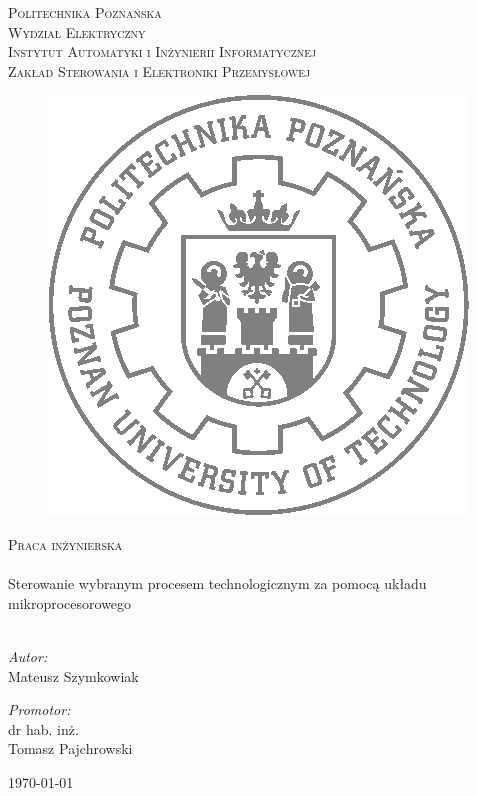 \begin{titlepage}
	\begin{center}
		\textsc{\LARGE Politechnika Poznańska}\\[0.3cm] 
		\textsc{\large Wydział Elektryczny}\\[0.3cm]
		\textsc{\large Instytut Automatyki i Inżynierii Informatycznej}\\[0.3cm]
		\textsc{\large Zakład Sterowania i Elektroniki Przemysłowej}\\[0.3cm]
		\begin{figure}[!ht]
		\centering
		\includegraphics[scale=0.5]{pictures/logoPP.png}
		\end{figure}
		\textsc{\Large Praca inżynierska}\\[0.5cm]
		\HRule \\[0.4cm]
		{ \huge  Sterowanie wybranym procesem technologicznym za pomocą układu mikroprocesorowego\\[0.4cm] }
		\HRule \\[2.5cm]
		\noindent
		\begin{minipage}{0.4\textwidth}
			\begin{flushleft} 
				\large \emph{Autor:}\\ Mateusz Szymkowiak
			\end{flushleft}
		\end{minipage}%
		\begin{minipage}{0.4\textwidth}
			\begin{flushright} \large
				\emph{Promotor:} \\ \hfill dr hab. inż. 
				\\Tomasz Pajchrowski
				
			\end{flushright}
		\end{minipage}
		
		\vfill
		
		{\large \today}
		
		
	\end{center}

\end{titlepage}



